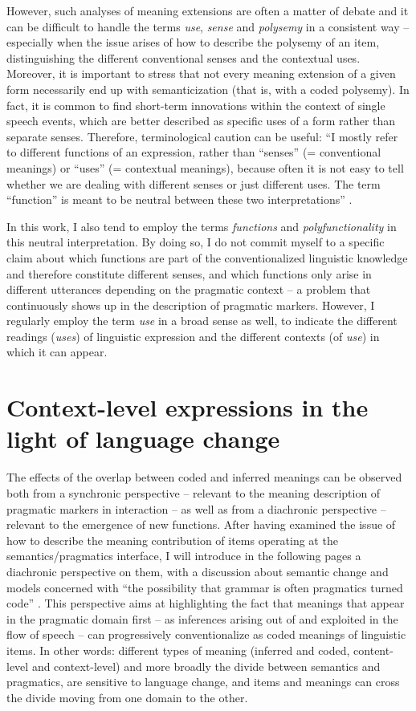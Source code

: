 However, such analyses of meaning extensions are often a matter of debate and it can be difficult to handle the terms \textit{use}, \textit{sense} and \textit{polysemy} in a consistent way – especially when the issue arises of how to describe the polysemy of an item, distinguishing the different conventional senses and the contextual uses. Moreover, it is important to stress that not every meaning extension of a given form necessarily end up with semanticization (that is, with a coded polysemy). In fact, it is common to find short-term innovations within the context of single speech events, which are better described as specific uses of a form rather than separate senses. Therefore, terminological caution can be useful: “I mostly refer to different functions of an expression, rather than “senses” (= conventional meanings) or “uses” (= contextual meanings), because often it is not easy to tell whether we are dealing with different senses or just different uses. The term “function” is meant to be neutral between these two interpretations” \citep[212]{Haspelmath2003}.

In this work, I also tend to employ the terms \textit{functions} and \textit{polyfunctionality} in this neutral interpretation. By doing so, I do not commit myself to a specific claim about which functions are part of the conventionalized linguistic knowledge and therefore constitute different senses, and which functions only arise in different utterances depending on the pragmatic context – a problem that continuously shows up in the description of pragmatic markers. However, I regularly employ the term \textit{use} in a broad sense as well, to indicate the different readings (\textit{uses}) of linguistic expression and the different contexts (of \textit{use}) in which it can appear.

\section{Context-level expressions in the light of language change}
\hypertarget{Toc124860631}{}
The effects of the overlap between coded and inferred meanings can be observed both from a synchronic perspective – relevant to the meaning description of pragmatic markers in interaction – as well as from a diachronic perspective – relevant to the emergence of new functions. After having examined the issue of how to describe the meaning contribution of items operating at the semantics/pragmatics interface, I will introduce in the following pages a diachronic perspective on them, with a discussion about semantic change and models concerned with “the possibility that grammar is often pragmatics turned code” \citep[111]{Ariel2008}. This perspective aims at highlighting the fact that meanings that appear in the pragmatic domain first – as inferences arising out of and exploited in the flow of speech – can progressively conventionalize as coded meanings of linguistic items. In other words: different types of meaning (inferred and coded, content-level and context-level) and more broadly the divide between semantics and pragmatics, are sensitive to language change, and items and meanings can cross the divide moving from one domain to the other.

